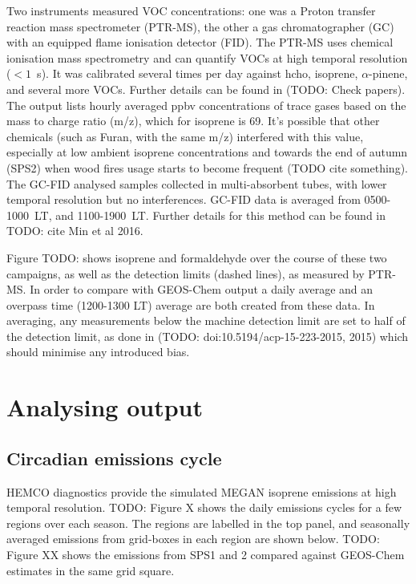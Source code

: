     Two instruments measured VOC concentrations: one was a Proton transfer reaction mass spectrometer (PTR-MS), the other a gas chromatographer (GC) with an equipped flame ionisation detector (FID).
    The PTR-MS uses chemical ionisation mass spectrometry and can quantify VOCs at high temporal resolution ($< 1$~s).
    It was calibrated several times per day against hcho, isoprene, $\alpha$-pinene, and several more VOCs. Further details can be found in \cite{Dunne2012,Dunne2017} (TODO: Check papers).
    The output lists hourly averaged ppbv concentrations of trace gases based on the mass to charge ratio (m/z), which for isoprene is 69.
    It's possible that other chemicals (such as Furan, with the same m/z) interfered with this value, especially at low ambient isoprene concentrations and towards the end of autumn (SPS2) when wood fires usage starts to become frequent (TODO cite something).
    The GC-FID analysed samples collected in multi-absorbent tubes, with lower temporal resolution but no interferences. GC-FID data is averaged from 0500-1000~LT, and 1100-1900~LT. Further details for this method can be found in TODO: cite Min et al 2016.
    
    Figure TODO: shows isoprene and formaldehyde over the course of these two campaigns, as well as the detection limits (dashed lines), as measured by PTR-MS. In order to compare with GEOS-Chem output a daily average and an overpass time (1200-1300 LT) average are both created from these data.
    In averaging, any measurements below the machine detection limit are set to half of the detection limit, as done in (TODO: doi:10.5194/acp-15-223-2015, 2015) which should minimise any introduced bias.

\section{Analysing output}
\label{Model:Analysis}
  
  \subsection{Circadian emissions cycle}
    HEMCO diagnostics provide the simulated MEGAN isoprene emissions at high temporal resolution.
    TODO: Figure X shows the daily emissions cycles for a few regions over each season. 
    The regions are labelled in the top panel, and seasonally averaged emissions from grid-boxes in each region are shown below.
    TODO: Figure XX shows the emissions from SPS1 and 2 compared against GEOS-Chem estimates in the same grid square.
    
